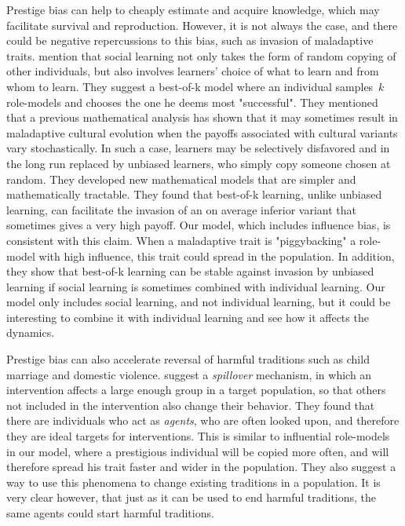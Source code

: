 \documentclass[12pt]{extarticle}
\begin{document}
Prestige bias can help to cheaply estimate and acquire knowledge, which may facilitate survival and reproduction. However, it is not always the case, and there could be negative repercussions to this bias, such as invasion of maladaptive traits.
\citet{best_of_k} mention that social learning not only takes the form of random copying of other individuals, but also involves learners' choice of what to learn and from whom to learn. They suggest a best-of-k model where an individual samples~$k$ role-models and chooses the one he deems most "successful". They mentioned that a previous mathematical analysis has shown that it may sometimes result in maladaptive cultural evolution when the payoffs associated with cultural variants vary stochastically. In such a case, learners may be selectively disfavored and in the long run replaced by unbiased learners, who simply copy someone chosen at random. They developed new mathematical models that are simpler and mathematically tractable. They found that best-of-k learning, unlike unbiased learning, can facilitate the invasion of an on average inferior variant that sometimes gives a very high payoff. Our model, which includes influence bias, is consistent with this claim. When a maladaptive trait is "piggybacking" a role-model with high influence, this trait could spread in the population.
In addition, they show that best-of-k learning can be stable against invasion by unbiased learning if social learning is sometimes combined with individual learning. 
Our model only includes social learning, and not individual learning, but it could be interesting to combine it with individual learning and see how it affects the dynamics.

Prestige bias can also accelerate reversal of harmful traditions such as child marriage and domestic violence. 
\citet{harmful_traditions} suggest a \emph{spillover}  mechanism, in which an intervention affects a large enough group in a target population, so that others not included in the intervention also change their behavior.
They found that there are individuals who act as \emph{agents}, who are often looked upon, and therefore they are ideal targets for interventions. This is similar to influential role-models in our model, where a prestigious individual will be copied more often, and will therefore spread his trait faster and wider in the population.
They also suggest a way to use this phenomena to change existing traditions in a population. It is very clear however, that just as it can be used to end harmful traditions, the same agents could start harmful traditions.
\end{document}
